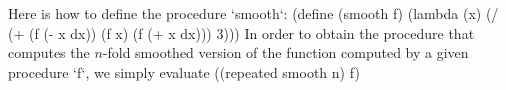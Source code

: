 Here is how to define the procedure `smooth`:
\begtt\scm 
(define (smooth f)
  (lambda (x)
    (/ (+ (f (- x dx))
          (f x)
          (f (+ x dx)))
       3)))
\endtt
In order to obtain the procedure that computes the $n$-fold smoothed version of the function computed by a given procedure `f`, we simply evaluate
\begtt\scm
((repeated smooth n) f)
\endtt
